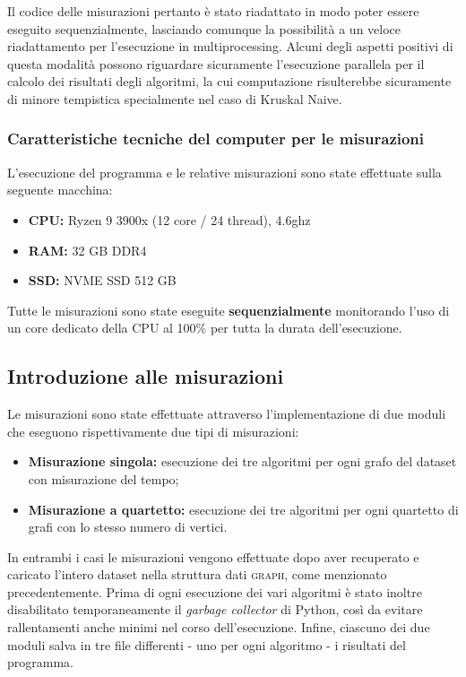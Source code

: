 Il codice delle misurazioni pertanto è stato riadattato in modo poter essere eseguito sequenzialmente, lasciando comunque la possibilità a un veloce riadattamento per l'esecuzione in multiprocessing. Alcuni degli aspetti positivi di questa modalità possono riguardare sicuramente l'esecuzione parallela per il calcolo dei risultati degli algoritmi, la cui computazione risulterebbe sicuramente di minore tempistica specialmente nel caso di Kruskal Naive.   

\subsubsection{Caratteristiche tecniche del computer per le misurazioni} %

L'esecuzione del programma e le relative misurazioni sono state effettuate sulla seguente macchina:
\begin{itemize}
    \item \textbf{CPU:} Ryzen 9 3900x (12 core / 24 thread), 4.6ghz
    \item \textbf{RAM:} 32 GB DDR4
    \item \textbf{SSD:} NVME SSD 512 GB
\end{itemize}

\noindent Tutte le misurazioni sono state eseguite \textbf{sequenzialmente} monitorando l'uso di un core dedicato della CPU al 100\% per tutta la durata dell'esecuzione.




\subsection{Introduzione alle misurazioni} 

Le misurazioni sono state effettuate attraverso l'implementazione di due moduli che eseguono rispettivamente due tipi di misurazioni:

\begin{itemize}
    \item \textbf{Misurazione singola:} esecuzione dei tre algoritmi per ogni grafo del dataset con misurazione del tempo;
    \item \textbf{Misurazione a quartetto:} esecuzione dei tre algoritmi per ogni quartetto di grafi con lo stesso numero di vertici.
\end{itemize}

In entrambi i casi le misurazioni vengono effettuate dopo aver recuperato e caricato l'intero dataset nella struttura dati \textsc{graph}, come menzionato precedentemente.
Prima di ogni esecuzione dei vari algoritmi è stato inoltre disabilitato temporaneamente il \textit{garbage collector} di Python, così da evitare rallentamenti anche minimi nel corso dell'esecuzione. Infine, ciascuno dei due moduli salva in tre file differenti - uno per ogni algoritmo - i risultati del programma.


